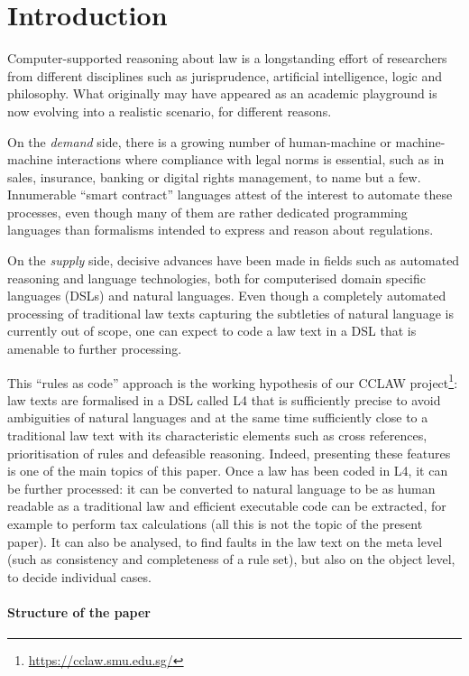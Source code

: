 \section{Introduction}\label{sec:introduction}

Computer-supported reasoning about law is a longstanding effort of researchers
from different disciplines such as jurisprudence, artificial intelligence, logic and
philosophy. What originally may have appeared as an academic playground is
now evolving into a realistic scenario, for different reasons. 

On the \emph{demand} side, there is a growing number of human-machine or
machine-machine interactions where compliance with legal norms is essential,
such as in sales, insurance, banking or digital rights management, to name but
a few. Innumerable ``smart contract'' languages attest of the interest to
automate these processes, even though many of them are rather dedicated
programming languages than formalisms intended to express and reason about
regulations.

On the \emph{supply} side, decisive advances have been made in fields such as
automated reasoning and language technologies, both for computerised domain
specific languages (DSLs) and natural languages. Even though a completely
automated processing of traditional law texts capturing the subtleties of
natural language is currently out of scope, one can expect to code a law text
in a DSL that is amenable to further processing.

This ``rules as code'' approach is the working hypothesis of our CCLAW
project\footnote{\url{https://cclaw.smu.edu.sg/}}: law texts are formalised in
a DSL called L4 that is sufficiently precise to avoid ambiguities of natural
languages and at the same time sufficiently close to a traditional law text
with its characteristic elements such as cross references, prioritisation of
rules and defeasible reasoning. Indeed, presenting these features is one of
the main topics of this paper. Once a law has been coded in L4, it can
be further processed: it can be converted to natural language \cite{listemnmaa2021cnl} to
be as human readable as a traditional law and efficient executable code can be
extracted, for example to perform tax calculations (all this is not the topic
of the present paper). It can also be analysed, to find faults in the law
text on the meta level (such as consistency and completeness of a rule set),
but also on the object level, to decide individual cases.

\paragraph{Structure of the paper}




